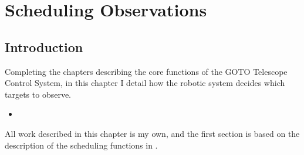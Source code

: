 \chapter{Scheduling Observations}
\label{chap:scheduling}
\chaptoc{}


\newpage
\section{Introduction}
\label{sec:scheduling_intro}
\begin{colsection}

Completing the chapters describing the core functions of the GOTO Telescope Control System, in this chapter I detail how the robotic system decides which targets to observe. 
%
\begin{itemize}
    \item
\end{itemize}
%
All work described in this chapter is my own, and the first section is based on the description of the scheduling functions in \citet{Dyer}.

\end{colsection}


\newpage
